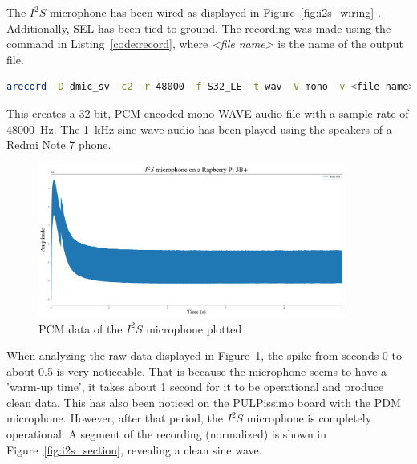 The $I^2S$ microphone has been wired as displayed in Figure~\ref{fig:i2s_wiring} \cite{i2s_wiring}.
Additionally, SEL has been tied to ground.
The recording was made using the command in Listing~\ref{code:record},
where \emph{<file name>} is the name of the output file.

\begin{minipage}{\textwidth}
\begin{lstlisting}[style=colorEX,language=bash,caption={Recording Command},label={code:record}]
arecord -D dmic_sv -c2 -r 48000 -f S32_LE -t wav -V mono -v <file name>
\end{lstlisting}
\end{minipage}

This creates a 32-bit, PCM-encoded mono WAVE audio file with a sample rate of \SI{48000}{\hertz}.
The \SI{1}{\kilo\hertz} sine wave audio has been played using the speakers of a Redmi Note 7 phone.

\begin{figure}[H]
    \centering
    \includegraphics[width=0.9\textwidth]{figures/i2s/i2s_raw_data.png}
    \caption[PCM data of the $I^2S$ microphone plotted]{PCM data of the $I^2S$ microphone plotted}
    \label{fig:i2s_raw}
\end{figure}

When analyzing the raw data displayed in Figure~\ref{fig:i2s_raw}, the spike from seconds 0 to about 0.5
is very noticeable. That is because the microphone seems to have a 'warm-up time', it takes about 1 second for it to be operational and produce clean data.
This has also been noticed on the PULPissimo board with the PDM microphone.
However, after that period, the $I^2S$ microphone is completely operational.
A segment of the recording (normalized) is shown in Figure~\ref{fig:i2s_section}, revealing a clean sine wave.

